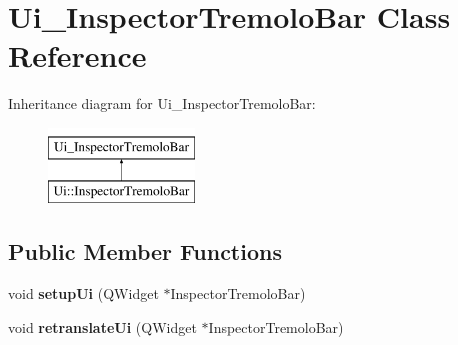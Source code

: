 \hypertarget{class_ui___inspector_tremolo_bar}{}\section{Ui\+\_\+\+Inspector\+Tremolo\+Bar Class Reference}
\label{class_ui___inspector_tremolo_bar}
Inheritance diagram for Ui\+\_\+\+Inspector\+Tremolo\+Bar\+:\begin{figure}[H]
\begin{center}
\leavevmode
\includegraphics[height=2.000000cm]{class_ui___inspector_tremolo_bar}
\end{center}
\end{figure}
\subsection*{Public Member Functions}
\begin{DoxyCompactItemize}
\item 
\mbox{\label{class_ui___inspector_tremolo_bar_a9c4d966fd3449009af010cfedb7636e6}} 
void {\bfseries setup\+Ui} (Q\+Widget $\ast$Inspector\+Tremolo\+Bar)
\item 
\mbox{\label{class_ui___inspector_tremolo_bar_a3b109d8a9c9f70315622851f3e573049}} 
void {\bfseries retranslate\+Ui} (Q\+Widget $\ast$Inspector\+Tremolo\+Bar)
\end{DoxyCompactItemize}
